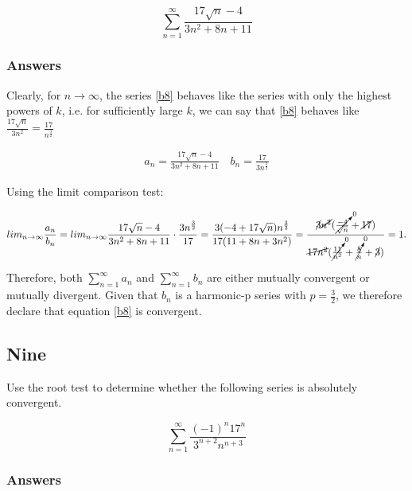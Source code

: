 \documentclass{article}
\begin{document}
\begin{equation}\label{b8}
\sum_{n=1}^{\infty} \frac{17\sqrt{n}-4}{3n^2+8n+11}
\end{equation}

\subsubsection*{Answers}

Clearly, for $n \to \infty$, the series \ref{b8} behaves like the series with only the highest powers of $k$, i.e. for sufficiently large $k$, we can say that \ref{b8} behaves like $\frac{17\sqrt{n}}{3n^2} = \frac{17}{n^{\frac{3}{2}}}$

\begin{align*}
a_n = \frac{17\sqrt{n}-4}{3n^2+8n+11} \quad b_n = \frac{17}{3n^\frac{3}{2}}
\end{align*}

Using the limit comparison test:

\begin{align*}
lim_{n\to\infty} \frac{a_n}{b_n} = lim_{n\to\infty} \frac{17\sqrt{n}-4}{3n^2+8n+11} \cdot  \frac{3n^\frac{3}{2}}{17} = \frac{3(-4+17\sqrt{n})n^{\frac{3}{2}}}{17(11+8n+3n^2)}
= \frac{\cancel{3}\cancel{n^2}(\cancelto{0}{\frac{-4}{\sqrt{n}}}+\cancel{17})}{\cancel{17n^2}(\cancelto{0}{\frac{11}{n^2}}+\cancelto{0}{\frac{8}{n}}+\cancel{3})} = 1.
\end{align*}

Therefore, both $\sum_{n=1}^{\infty} a_n$ and  $\sum_{n=1}^{\infty} b_n$ are either mutually convergent or mutually divergent.
Given that $b_n$ is a harmonic-p series with $p=\frac{3}{2}$, we therefore declare that equation \ref{b8} is convergent.


\par

\subsection*{Nine}

Use the root test to determine whether the following series is absolutely convergent.

\begin{equation}\label{b9}
\sum_{n=1}^{\infty} \frac{(-1)^n 17^n}{3^{n+2} n^{n+3}}
\end{equation}

\subsubsection*{Answers}
\end{document}
